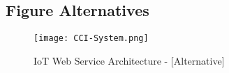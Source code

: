\subsection{Figure Alternatives}
\begin{figure}[!h]
    \centering
    \texttt{[image: CCI-System.png]}
    \caption{IoT Web Service Architecture - [Alternative]}\label{fig::arch}
\end{figure}